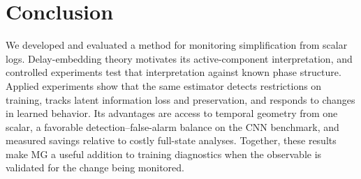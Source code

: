 {\section{Conclusion}
We developed and evaluated a method for monitoring simplification from scalar logs. Delay-embedding theory motivates its active-component interpretation, and controlled experiments test that interpretation against known phase structure. Applied experiments show that the same estimator detects restrictions on training, tracks latent information loss and preservation, and responds to changes in learned behavior. Its advantages are access to temporal geometry from one scalar, a favorable detection--false-alarm balance on the CNN benchmark, and measured savings relative to costly full-state analyses. Together, these results make MG a useful addition to training diagnostics when the observable is validated for the change being monitored.
}
